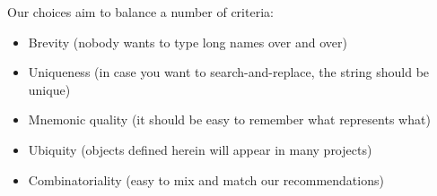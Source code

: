Our choices aim to balance a number of criteria:

\begin{itemize}
\item Brevity (nobody wants to type long names over and over)
\item Uniqueness (in case you want to search-and-replace, the string should be unique)
\item Mnemonic quality (it should be easy to remember what represents what)
\item Ubiquity (objects defined herein will appear in many projects)
\item Combinatoriality (easy to mix and match our recommendations)
\end{itemize}

